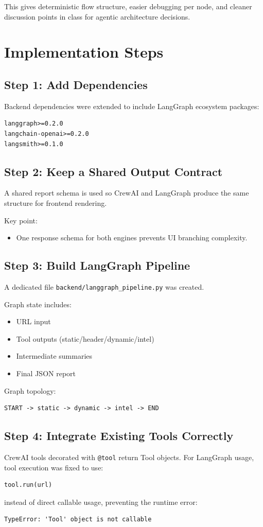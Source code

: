\documentclass[11pt,a4paper]{article}
\begin{document}
This gives deterministic flow structure, easier debugging per node, and cleaner discussion points in class for agentic architecture decisions.

\section{Implementation Steps}
\subsection{Step 1: Add Dependencies}
Backend dependencies were extended to include LangGraph ecosystem packages:
\begin{lstlisting}[style=code]
langgraph>=0.2.0
langchain-openai>=0.2.0
langsmith>=0.1.0
\end{lstlisting}

\subsection{Step 2: Keep a Shared Output Contract}
A shared report schema is used so CrewAI and LangGraph produce the same structure for frontend rendering.

Key point:
\begin{itemize}[leftmargin=1.25em]
  \item One response schema for both engines prevents UI branching complexity.
\end{itemize}

\subsection{Step 3: Build LangGraph Pipeline}
A dedicated file \texttt{backend/langgraph\_pipeline.py} was created.

Graph state includes:
\begin{itemize}[leftmargin=1.25em]
  \item URL input
  \item Tool outputs (static/header/dynamic/intel)
  \item Intermediate summaries
  \item Final JSON report
\end{itemize}

Graph topology:
\begin{lstlisting}[style=code]
START -> static -> dynamic -> intel -> END
\end{lstlisting}

\subsection{Step 4: Integrate Existing Tools Correctly}
CrewAI tools decorated with \texttt{@tool} return Tool objects. For LangGraph usage, tool execution was fixed to use:
\begin{lstlisting}[style=code]
tool.run(url)
\end{lstlisting}
instead of direct callable usage, preventing the runtime error:
\begin{lstlisting}[style=code]
TypeError: 'Tool' object is not callable
\end{lstlisting}
\end{document}
